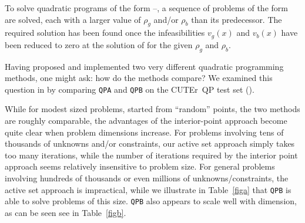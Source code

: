 \documentclass[twoside]{article}
\newcommand{\cuter}{{\sf CUTEr}}
\begin{document}
To solve quadratic programs of the form --,
a sequence of problems of the form  are
solved, each with a larger value of $\rho_g$ and/or $\rho_b$
than its predecessor. The
required solution has been found once the infeasibilities
$v_g(x)$ and $v_b(x)$ have been reduced to zero at the solution of
 for the given $\rho_g$ and $\rho_b$.

Having proposed and implemented two very different quadratic programming
methods, one might ask: how do the methods compare? We examined
this question in  by comparing {\tt QPA} and {\tt QPB}
on the \cuter\ QP test set ().

While for modest sized problems, started from ``random'' points, the two
methods are roughly comparable, the advantages of the interior-point approach
become quite clear when problem dimensions increase. For problems involving
tens of thousands of unknowns and/or constraints, our active set approach
simply takes too many iterations, while the number of iterations
required by the interior point approach seems relatively insensitive to
problem size. For general problems involving hundreds of thousands or
even millions of unknowns/constraints, the active set approach is impractical,
while we illustrate in Table~\ref{figa} that
{\tt QPB} is able to solve problems of this size.
{\tt QPB} also appears to scale well with dimension, as can be seen
see in Table~\ref{figb}.
\end{document}
